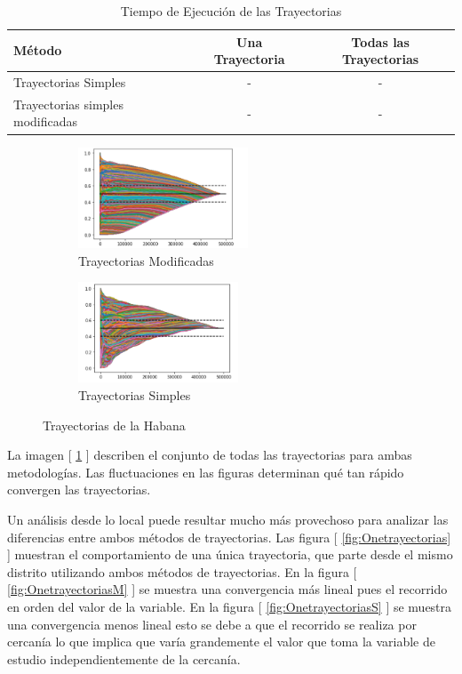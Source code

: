 \begin{table}[h!]
	\begin{center}
		\begin{tabular}{| l | c | c |}
			\hline
			Método & Una Trayectoria & Todas las Trayectorias \\ \hline
			Trayectorias Simples & - & - \\
			Trayectorias simples modificadas & - & - \\ \hline
		
		\end{tabular}
		\caption{Tiempo de Ejecución de las Trayectorias}
		\label{tab:resumenTrayectorias}
	\end{center}
\end{table}

\begin{figure}[h!]
	\centering
	\begin{subfigure}[b]{0.49\linewidth}
		\includegraphics[width=\linewidth, height=3cm]{Images/TrayecCon.png}
		\caption{Trayectorias Modificadas}
	\end{subfigure}
	\begin{subfigure}[b]{0.49\linewidth}
		\includegraphics[width=\linewidth, height=3cm]{Images/ValueTray.png}
		\caption{Trayectorias Simples}
	\end{subfigure}

	\caption{Trayectorias de la Habana}
	\label{fig:trayectorias}
\end{figure}

La imagen [ \ref{fig:trayectorias} ] describen el conjunto de todas las trayectorias para ambas metodologías. Las fluctuaciones en las figuras determinan qué tan rápido convergen las trayectorias.

\newpage

Un análisis desde lo local puede resultar mucho más provechoso para analizar las diferencias entre ambos métodos de trayectorias. Las figura [ \ref{fig:Onetrayectorias} ] muestran el comportamiento de una única trayectoria, que parte desde el mismo distrito utilizando ambos métodos de trayectorias. En la figura [ \ref{fig:OnetrayectoriasM} ] se muestra una convergencia más lineal pues el recorrido en orden del valor de la variable. En la figura [ \ref{fig:OnetrayectoriasS} ] se muestra una convergencia menos lineal esto se debe a que el recorrido se realiza por cercanía lo que implica que varía grandemente el valor que toma la variable de estudio independientemente de la cercanía.

